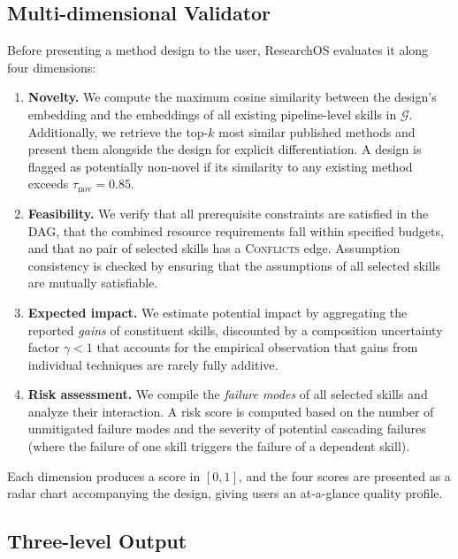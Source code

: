 \subsection{Multi-dimensional Validator}
\label{sec:validator}

Before presenting a method design to the user, ResearchOS evaluates it along four dimensions:

\begin{enumerate}[leftmargin=1.5em,itemsep=2pt]
    \item \textbf{Novelty.} We compute the maximum cosine similarity between the design's embedding and the embeddings of all existing pipeline-level skills in $\mathcal{G}$. Additionally, we retrieve the top-$k$ most similar published methods and present them alongside the design for explicit differentiation. A design is flagged as potentially non-novel if its similarity to any existing method exceeds $\tau_{\text{nov}} = 0.85$.

    \item \textbf{Feasibility.} We verify that all prerequisite constraints are satisfied in the DAG, that the combined resource requirements fall within specified budgets, and that no pair of selected skills has a \textsc{Conflicts} edge. Assumption consistency is checked by ensuring that the assumptions of all selected skills are mutually satisfiable.

    \item \textbf{Expected impact.} We estimate potential impact by aggregating the reported \emph{gains} of constituent skills, discounted by a composition uncertainty factor $\gamma < 1$ that accounts for the empirical observation that gains from individual techniques are rarely fully additive.

    \item \textbf{Risk assessment.} We compile the \emph{failure modes} of all selected skills and analyze their interaction. A risk score is computed based on the number of unmitigated failure modes and the severity of potential cascading failures (where the failure of one skill triggers the failure of a dependent skill).
\end{enumerate}

Each dimension produces a score in $[0,1]$, and the four scores are presented as a radar chart accompanying the design, giving users an at-a-glance quality profile.

\subsection{Three-level Output}
\label{sec:output_levels}

